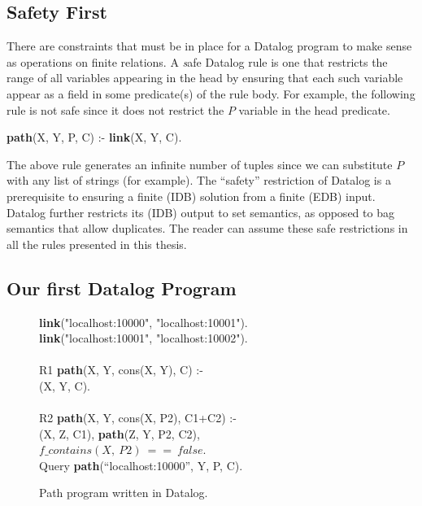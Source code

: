 \subsection{Safety First}

There are constraints that must be in place for a Datalog program to make sense
as operations on finite relations.  A {\emph safe} Datalog rule is one that
restricts the range of all variables appearing in the head by ensuring that
each such variable appear as a field in some predicate(s) of the rule body.
For example, the following rule is not safe since it does not restrict the $P$
variable in the  head predicate.

\begin{minipage}{\linewidth}
\ssp
{\bf path}(X, Y, P, C) :- {\bf link}(X, Y, C). \\
\end{minipage}
The above rule generates an infinite number of  tuples since we can
substitute $P$ with any list of strings (for example).  The ``safety''
restriction of Datalog is a prerequisite to ensuring a finite (IDB) solution
from a finite (EDB) input.  Datalog further restricts its (IDB) output to set
semantics, as opposed to bag semantics that allow duplicates.  The reader can
assume these safe restrictions in all the rules presented in this thesis.

\subsection{Our first Datalog Program}

\begin{figure}
\ssp
\begin{boxedminipage}{\linewidth}
{\bf link}("localhost:10000", "localhost:10001"). \\
{\bf link}("localhost:10001", "localhost:10002"). \\
\\
R1 {\bf path}(X, Y, cons(X, Y), C) :- \\
(X, Y, C). \\
\\       
R2 {\bf path}(X, Y, cons(X, P2), C1+C2) :- \\
(X, Z, C1), {\bf path}(Z, Y, P2, C2), \\
\datalogspace $f\_contains(X,\ P2)\ ==\ false$. \\

Query {\bf path}(``localhost:10000'', Y, P, C).
\end{boxedminipage}
\caption{\label{ch:p2:fig:datalogPath}Path program written in Datalog.}
\end{figure}

